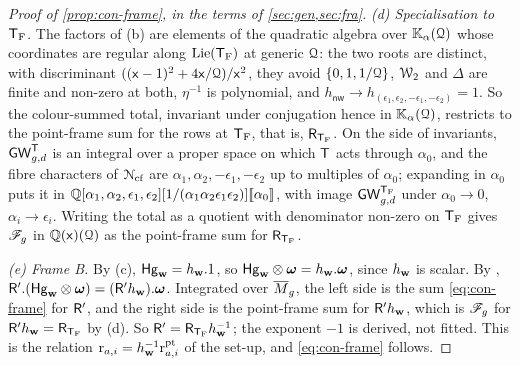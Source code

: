 \begin{proof}[Proof of \cref{prop:con-frame}, in the terms of \cref{sec:gen,sec:fra}]
\emph{(d) Specialisation to $\mathsf{T}_{\mathrm{F}}$.} The factors of (b) are elements of the quadratic algebra over $\mathbb{K}_{\alpha}(\mathcal{Q})$ whose coordinates are regular along $\mathrm{Lie}(\mathsf{T}_{\mathrm{F}})$ at generic $\mathcal{Q}$: the two roots are distinct, with discriminant $((\mathsf{x}-1)^2+4\mathsf{x}/\mathcal{Q})/\mathsf{x}^2$, they avoid $\{0,1,1/\mathcal{Q}\}$, $\mathcal{W}_2$ and $\Delta$ are finite and non-zero at both, $\eta^{-1}$ is polynomial, and $h_{\mathsf{nw}}\to h_{(\epsilon_1,\epsilon_2,-\epsilon_1,-\epsilon_2)}=1$. So the colour-summed total, invariant under conjugation hence in $\mathbb{K}_{\alpha}(\mathcal{Q})$, restricts to the point-frame sum for the rows at $\mathsf{T}_{\mathrm{F}}$, that is, $\mathsf{R}_{\mathsf{T}_{\mathrm{F}}}$. On the side of invariants, $\mathsf{GW}^{\mathsf{T}}_{g,d}$ is an integral over a proper space on which $\mathsf{T}$ acts through $\alpha_0$, and the fibre characters of $\mathcal{N}_{\mathrm{cf}}$ are $\alpha_1,\alpha_2,-\epsilon_1,-\epsilon_2$ up to multiples of $\alpha_0$; expanding in $\alpha_0$ puts it in $\mathbb{Q}[\alpha_1,\alpha_2,\epsilon_1,\epsilon_2][1/(\alpha_1\alpha_2\epsilon_1\epsilon_2)][\![ \alpha_0 ]\!]$, with image $\mathsf{GW}^{\mathsf{T}_{\mathrm{F}}}_{g,d}$ under $\alpha_0\to 0$, $\alpha_i\to\epsilon_i$. Writing the total as a quotient with denominator non-zero on $\mathsf{T}_{\mathrm{F}}$ gives $\mathscr{F}_g$ in $\mathbb{Q}(\mathsf{x})(\mathcal{Q})$ as the point-frame sum for $\mathsf{R}_{\mathsf{T}_{\mathrm{F}}}$.

\emph{(e) Frame B.} By (c), $\mathsf{Hg}_{\mathbf{w}}=h_{\mathbf{w}}.1$, so $\mathsf{Hg}_{\mathbf{w}}\otimes\boldsymbol{\omega}=h_{\mathbf{w}}.\boldsymbol{\omega}$, since $h_{\mathbf{w}}$ is scalar. By \cite[Prop.~2.14]{PPZ15}, $\mathsf{R}'.(\mathsf{Hg}_{\mathbf{w}}\otimes\boldsymbol{\omega})=(\mathsf{R}'h_{\mathbf{w}}).\boldsymbol{\omega}$. Integrated over $\overline{M}_g$, the left side is the sum \cref{eq:con-frame} for $\mathsf{R}'$, and the right side is the point-frame sum for $\mathsf{R}'h_{\mathbf{w}}$, which is $\mathscr{F}_g$ for $\mathsf{R}'h_{\mathbf{w}}=\mathsf{R}_{\mathsf{T}_{\mathrm{F}}}$ by (d). So $\mathsf{R}'=\mathsf{R}_{\mathsf{T}_{\mathrm{F}}}h_{\mathbf{w}}^{-1}$; the exponent $-1$ is derived, not fitted. This is the relation $\mathrm{r}_{a,i}=h_{\mathbf{w}}^{-1}\mathrm{r}^{\mathrm{pt}}_{a,i}$ of the set-up, and \cref{eq:con-frame} follows.
\end{proof}


